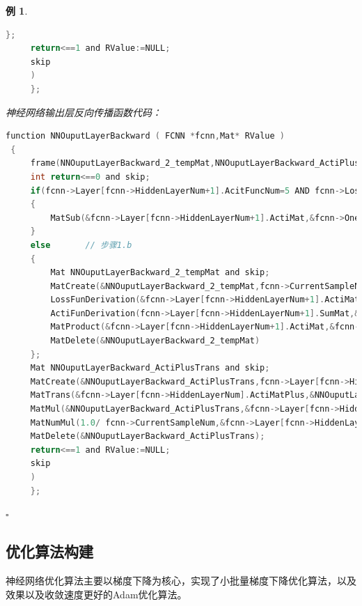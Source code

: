 \documentclass[UTF-8]{progbookcn}
\newtheorem{example}{例}[chapter]         %
\begin{document}
\begin{example}
\begin{lstlisting}[language=C,caption={函数 4 NNBackward}]
     };
     return<==1 and RValue:=NULL;
     skip
     )
     };
\end{lstlisting}

\noindent 神经网络输出层反向传播函数代码：
\begin{lstlisting}[language=C,caption={函数 3 NNOuputLayerBackward}]
function NNOuputLayerBackward ( FCNN *fcnn,Mat* RValue )
 {
     frame(NNOuputLayerBackward_2_tempMat,NNOuputLayerBackward_ActiPlusTrans,return) and (
     int return<==0 and skip;
     if(fcnn->Layer[fcnn->HiddenLayerNum+1].AcitFuncNum=5 AND fcnn->LossFuncNum=1) then     // 步骤1.a
     {
         MatSub(&fcnn->Layer[fcnn->HiddenLayerNum+1].ActiMat,&fcnn->OnehotMat,&fcnn->Layer[fcnn->HiddenLayerNum+1].DeltaMat,RValue)
     }
     else       // 步骤1.b
     {
         Mat NNOuputLayerBackward_2_tempMat and skip;
         MatCreate(&NNOuputLayerBackward_2_tempMat,fcnn->CurrentSampleNum,fcnn->Layer[fcnn->HiddenLayerNum+1].NeuronNum,RValue);
         LossFunDerivation(&fcnn->Layer[fcnn->HiddenLayerNum+1].ActiMat,&NNOuputLayerBackward_2_tempMat,fcnn->OnehotMat,fcnn->LossFuncNum,RValue);
         ActiFunDerivation(fcnn->Layer[fcnn->HiddenLayerNum+1].SumMat,&fcnn->Layer[fcnn->HiddenLayerNum+1].ActiFunDerivationMat,fcnn->Layer[fcnn->HiddenLayerNum+1].AcitFuncNum,RValue);
         MatProduct(&fcnn->Layer[fcnn->HiddenLayerNum+1].ActiMat,&fcnn->Layer[fcnn->HiddenLayerNum+1].ActiFunDerivationMat,&fcnn->Layer[fcnn->HiddenLayerNum+1].DeltaMat,RValue);
         MatDelete(&NNOuputLayerBackward_2_tempMat)
     };
     Mat NNOuputLayerBackward_ActiPlusTrans and skip;
     MatCreate(&NNOuputLayerBackward_ActiPlusTrans,fcnn->Layer[fcnn->HiddenLayerNum].NeuronNum+1,fcnn->CurrentSampleNum,RValue);
     MatTrans(&fcnn->Layer[fcnn->HiddenLayerNum].ActiMatPlus,&NNOuputLayerBackward_ActiPlusTrans,RValue);
     MatMul(&NNOuputLayerBackward_ActiPlusTrans,&fcnn->Layer[fcnn->HiddenLayerNum+1].DeltaMat,&fcnn->Layer[fcnn->HiddenLayerNum+1].NablaWbMat,RValue);
     MatNumMul(1.0/ fcnn->CurrentSampleNum,&fcnn->Layer[fcnn->HiddenLayerNum+1].NablaWbMat,&fcnn->Layer[fcnn->HiddenLayerNum+1].NablaWbMat,RValue);
     MatDelete(&NNOuputLayerBackward_ActiPlusTrans);
     return<==1 and RValue:=NULL;
     skip
     )
     };
\end{lstlisting}
\hfill$\square$\end{example}
\newpage

\subsection{优化算法构建}
\begin{keypoint}
神经网络优化算法主要以梯度下降为核心，实现了小批量梯度下降优化算法，以及效果以及收敛速度更好的Adam优化算法。
\end{keypoint}
\end{document}
